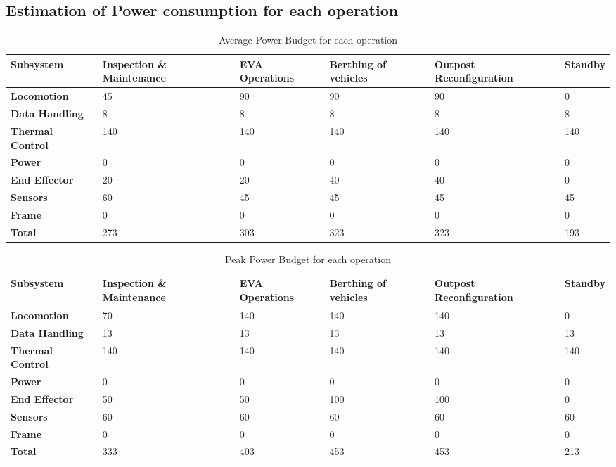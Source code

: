 \begin{landscape}
\section{Estimation of Power consumption for each operation}
\label{app:powerbudgets}
\vspace{-12pt}
\begin{table}[H]
\centering
\caption{Average Power Budget for each operation}
\begin{tabular}{C{3.5cm}C{3.4cm}C{3.4cm}C{3.4cm}C{3.4cm}C{3.4cm}}
\toprule
\textbf{Subsystem}	&	\textbf{Inspection \& Maintenance}	&	\textbf{EVA Operations}	&	\textbf{Berthing of vehicles}	&	\textbf{Outpost Reconfiguration}	&	\textbf{Standby}\\\midrule
\textbf{Locomotion}
&	45	&	90	&	90	&	90	&	0	\\
\textbf{Data Handling}
&	8	&	8	&	8	&	8	&	8	\\
\textbf{Thermal Control}
&	140	&	140	&	140	&	140	&	140	\\
\textbf{Power}
&	0	&	0	&	0	&	0	&	0	\\
\textbf{End Effector}
&	20	&	20	&	40	&	40	&	0	\\
\textbf{Sensors}
&	60	&	45	&	45	&	45	&	45	\\
\textbf{Frame}
&	0	&	0	&	0	&	0	&	0	\\\hline
\textbf{Total}
&	273	&	303	&	323	&	323	&	193	\\\bottomrule
\end{tabular}
\end{table}
\vspace{-12pt}
\begin{table}[H]
\centering
\caption{Peak Power Budget for each operation}
\begin{tabular}{C{3.5cm}C{3.4cm}C{3.4cm}C{3.4cm}C{3.4cm}C{3.4cm}}
\toprule
\textbf{Subsystem}	&	\textbf{Inspection \& Maintenance}	&	\textbf{EVA Operations}	&	\textbf{Berthing of vehicles}	&	\textbf{Outpost Reconfiguration}	&	\textbf{Standby}\\\midrule
\textbf{Locomotion}
&	70	&	140	&	140	&	140	&	0	\\
\textbf{Data Handling}
&	13	&	13	&	13	&	13	&	13	\\
\textbf{Thermal Control}
&	140	&	140	&	140	&	140	&	140	\\
\textbf{Power}
&	0	&	0	&	0	&	0	&	0	\\
\textbf{End Effector}
&	50	&	50	&	100	&	100	&	0	\\
\textbf{Sensors}
&	60	&	60	&	60	&	60	&	60	\\
\textbf{Frame}
&	0	&	0	&	0	&	0	&	0	\\\hline
\textbf{Total}
&	333	&	403	&	453	&	453	&	213	\\\bottomrule
\end{tabular}
\end{table}
\end{landscape}

